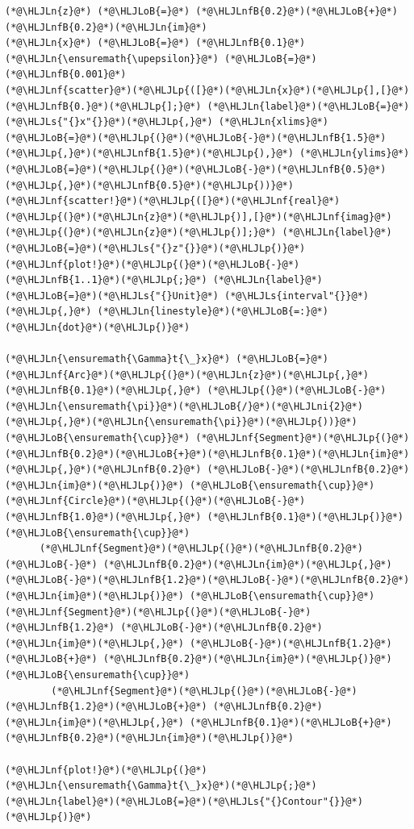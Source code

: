 \documentclass[12pt,a4paper]{article}
\newcommand{\HLJLn}[1]{#1}
\newcommand{\HLJLnf}[1]{\textcolor[RGB]{66,102,213}{#1}}
\newcommand{\HLJLs}[1]{\textcolor[RGB]{201,61,57}{#1}}
\newcommand{\HLJLnfB}[1]{\textcolor[RGB]{59,151,46}{#1}}
\newcommand{\HLJLni}[1]{\textcolor[RGB]{59,151,46}{#1}}
\newcommand{\HLJLoB}[1]{\textcolor[RGB]{102,102,102}{\textbf{#1}}}
\newcommand{\HLJLp}[1]{#1}
\def\upepsilon{\varepsilon}
\begin{document}
\begin{lstlisting}
(*@\HLJLn{z}@*) (*@\HLJLoB{=}@*) (*@\HLJLnfB{0.2}@*)(*@\HLJLoB{+}@*)(*@\HLJLnfB{0.2}@*)(*@\HLJLn{im}@*)
(*@\HLJLn{x}@*) (*@\HLJLoB{=}@*) (*@\HLJLnfB{0.1}@*)
(*@\HLJLn{\ensuremath{\upepsilon}}@*) (*@\HLJLoB{=}@*) (*@\HLJLnfB{0.001}@*)
(*@\HLJLnf{scatter}@*)(*@\HLJLp{([}@*)(*@\HLJLn{x}@*)(*@\HLJLp{],[}@*)(*@\HLJLnfB{0.}@*)(*@\HLJLp{];}@*) (*@\HLJLn{label}@*)(*@\HLJLoB{=}@*)(*@\HLJLs{"{}x"{}}@*)(*@\HLJLp{,}@*) (*@\HLJLn{xlims}@*)(*@\HLJLoB{=}@*)(*@\HLJLp{(}@*)(*@\HLJLoB{-}@*)(*@\HLJLnfB{1.5}@*)(*@\HLJLp{,}@*)(*@\HLJLnfB{1.5}@*)(*@\HLJLp{),}@*) (*@\HLJLn{ylims}@*)(*@\HLJLoB{=}@*)(*@\HLJLp{(}@*)(*@\HLJLoB{-}@*)(*@\HLJLnfB{0.5}@*)(*@\HLJLp{,}@*)(*@\HLJLnfB{0.5}@*)(*@\HLJLp{))}@*)
(*@\HLJLnf{scatter!}@*)(*@\HLJLp{([}@*)(*@\HLJLnf{real}@*)(*@\HLJLp{(}@*)(*@\HLJLn{z}@*)(*@\HLJLp{)],[}@*)(*@\HLJLnf{imag}@*)(*@\HLJLp{(}@*)(*@\HLJLn{z}@*)(*@\HLJLp{)];}@*) (*@\HLJLn{label}@*)(*@\HLJLoB{=}@*)(*@\HLJLs{"{}z"{}}@*)(*@\HLJLp{)}@*)
(*@\HLJLnf{plot!}@*)(*@\HLJLp{(}@*)(*@\HLJLoB{-}@*)(*@\HLJLnfB{1..1}@*)(*@\HLJLp{;}@*) (*@\HLJLn{label}@*)(*@\HLJLoB{=}@*)(*@\HLJLs{"{}Unit}@*) (*@\HLJLs{interval"{}}@*)(*@\HLJLp{,}@*) (*@\HLJLn{linestyle}@*)(*@\HLJLoB{=:}@*)(*@\HLJLn{dot}@*)(*@\HLJLp{)}@*)

(*@\HLJLn{\ensuremath{\Gamma}t{\_}x}@*) (*@\HLJLoB{=}@*)  (*@\HLJLnf{Arc}@*)(*@\HLJLp{(}@*)(*@\HLJLn{z}@*)(*@\HLJLp{,}@*) (*@\HLJLnfB{0.1}@*)(*@\HLJLp{,}@*) (*@\HLJLp{(}@*)(*@\HLJLoB{-}@*)(*@\HLJLn{\ensuremath{\pi}}@*)(*@\HLJLoB{/}@*)(*@\HLJLni{2}@*)(*@\HLJLp{,}@*)(*@\HLJLn{\ensuremath{\pi}}@*)(*@\HLJLp{))}@*) (*@\HLJLoB{\ensuremath{\cup}}@*) (*@\HLJLnf{Segment}@*)(*@\HLJLp{(}@*)(*@\HLJLnfB{0.2}@*)(*@\HLJLoB{+}@*)(*@\HLJLnfB{0.1}@*)(*@\HLJLn{im}@*)(*@\HLJLp{,}@*)(*@\HLJLnfB{0.2}@*) (*@\HLJLoB{-}@*)(*@\HLJLnfB{0.2}@*)(*@\HLJLn{im}@*)(*@\HLJLp{)}@*) (*@\HLJLoB{\ensuremath{\cup}}@*)    (*@\HLJLnf{Circle}@*)(*@\HLJLp{(}@*)(*@\HLJLoB{-}@*)(*@\HLJLnfB{1.0}@*)(*@\HLJLp{,}@*) (*@\HLJLnfB{0.1}@*)(*@\HLJLp{)}@*) (*@\HLJLoB{\ensuremath{\cup}}@*)
      (*@\HLJLnf{Segment}@*)(*@\HLJLp{(}@*)(*@\HLJLnfB{0.2}@*) (*@\HLJLoB{-}@*) (*@\HLJLnfB{0.2}@*)(*@\HLJLn{im}@*)(*@\HLJLp{,}@*) (*@\HLJLoB{-}@*)(*@\HLJLnfB{1.2}@*)(*@\HLJLoB{-}@*)(*@\HLJLnfB{0.2}@*)(*@\HLJLn{im}@*)(*@\HLJLp{)}@*) (*@\HLJLoB{\ensuremath{\cup}}@*) (*@\HLJLnf{Segment}@*)(*@\HLJLp{(}@*)(*@\HLJLoB{-}@*)(*@\HLJLnfB{1.2}@*) (*@\HLJLoB{-}@*)(*@\HLJLnfB{0.2}@*)(*@\HLJLn{im}@*)(*@\HLJLp{,}@*) (*@\HLJLoB{-}@*)(*@\HLJLnfB{1.2}@*)(*@\HLJLoB{+}@*) (*@\HLJLnfB{0.2}@*)(*@\HLJLn{im}@*)(*@\HLJLp{)}@*) (*@\HLJLoB{\ensuremath{\cup}}@*) 
        (*@\HLJLnf{Segment}@*)(*@\HLJLp{(}@*)(*@\HLJLoB{-}@*)(*@\HLJLnfB{1.2}@*)(*@\HLJLoB{+}@*) (*@\HLJLnfB{0.2}@*)(*@\HLJLn{im}@*)(*@\HLJLp{,}@*) (*@\HLJLnfB{0.1}@*)(*@\HLJLoB{+}@*)(*@\HLJLnfB{0.2}@*)(*@\HLJLn{im}@*)(*@\HLJLp{)}@*)

(*@\HLJLnf{plot!}@*)(*@\HLJLp{(}@*)(*@\HLJLn{\ensuremath{\Gamma}t{\_}x}@*)(*@\HLJLp{;}@*) (*@\HLJLn{label}@*)(*@\HLJLoB{=}@*)(*@\HLJLs{"{}Contour"{}}@*)(*@\HLJLp{)}@*)
\end{lstlisting}
\end{document}
